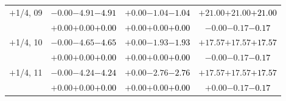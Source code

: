 \documentclass[compress]{beamer}
\begin{document}
\begin{frame}
\begin{tabular}{r | c | c | c}
$+$1/4, 09 & $-0.00$\hspace{0.1 cm}$-4.91$\hspace{0.1 cm}\textcolor{black}{$-4.91$} & $+0.00$\hspace{0.1 cm}$-1.04$\hspace{0.1 cm}\textcolor{black}{$-1.04$} & $+21.00$\hspace{0.1 cm}$+21.00$\hspace{0.1 cm}\textcolor{black}{$+21.00$} \\
           & $+0.00$\hspace{0.1 cm}$+0.00$\hspace{0.1 cm}\textcolor{black}{$+0.00$} & $+0.00$\hspace{0.1 cm}$+0.00$\hspace{0.1 cm}\textcolor{black}{$+0.00$} & $-0.00$\hspace{0.1 cm}$-0.17$\hspace{0.1 cm}\textcolor{black}{$-0.17$} \\
$+$1/4, 10 & $-0.00$\hspace{0.1 cm}$-4.65$\hspace{0.1 cm}\textcolor{black}{$-4.65$} & $+0.00$\hspace{0.1 cm}$-1.93$\hspace{0.1 cm}\textcolor{black}{$-1.93$} & $+17.57$\hspace{0.1 cm}$+17.57$\hspace{0.1 cm}\textcolor{black}{$+17.57$} \\
           & $+0.00$\hspace{0.1 cm}$+0.00$\hspace{0.1 cm}\textcolor{black}{$+0.00$} & $+0.00$\hspace{0.1 cm}$+0.00$\hspace{0.1 cm}\textcolor{black}{$+0.00$} & $-0.00$\hspace{0.1 cm}$-0.17$\hspace{0.1 cm}\textcolor{black}{$-0.17$} \\
$+$1/4, 11 & $-0.00$\hspace{0.1 cm}$-4.24$\hspace{0.1 cm}\textcolor{black}{$-4.24$} & $+0.00$\hspace{0.1 cm}$-2.76$\hspace{0.1 cm}\textcolor{black}{$-2.76$} & $+17.57$\hspace{0.1 cm}$+17.57$\hspace{0.1 cm}\textcolor{black}{$+17.57$} \\
           & $+0.00$\hspace{0.1 cm}$+0.00$\hspace{0.1 cm}\textcolor{black}{$+0.00$} & $+0.00$\hspace{0.1 cm}$+0.00$\hspace{0.1 cm}\textcolor{black}{$+0.00$} & $+0.00$\hspace{0.1 cm}$-0.17$\hspace{0.1 cm}\textcolor{black}{$-0.17$} \\

\end{tabular}
\end{frame}
\end{document}
